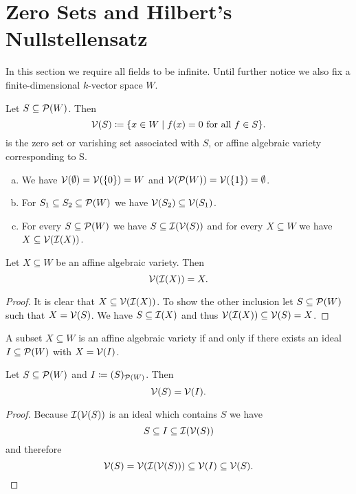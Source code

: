 \section{Zero Sets and Hilbert’s Nullstellensatz}
In this section we require all fields to be infinite. Until further notice we also fix a finite-dimensional $k$-vector space $W$.


\begin{defi}
 Let $S \subseteq \mathcal{P}(W)$. Then
 \[
  \mathcal{V}(S) \coloneqq \{x \in W \mid f(x) = 0 \text{ for all } f \in S\}.
 \]
 is the zero set or varishing set associated with $S$, or affine algebraic variety corresponding to S.
\end{defi}


\begin{expls}
 \begin{enumerate}[a)]
  \item
  We have $\mathcal{V}(\emptyset) = \mathcal{V}(\{0\}) = W$ and $\mathcal{V}(\mathcal{P}(W)) = \mathcal{V}(\{1\}) = \emptyset$.
  \item
  For $S_1 \subseteq S_2 \subseteq \mathcal{P}(W)$ we have $\mathcal{V}(S_2) \subseteq \mathcal{V}(S_1)$.
  \item
  For every $S \subseteq \mathcal{P}(W)$ we have $S \subseteq \mathcal{I}(\mathcal{V}(S))$ and for every $X \subseteq W$ we have $X \subseteq \mathcal{V}(\mathcal{I}(X))$.
 \end{enumerate}
\end{expls}


\begin{lem}
 Let $X \subseteq W$ be an affine algebraic variety. Then
 \[
  \mathcal{V}(\mathcal{I}(X)) = X.
 \]
\end{lem}
\begin{proof}
 It is clear that $X \subseteq \mathcal{V}(\mathcal{I}(X))$. To show the other inclusion let $S \subseteq \mathcal{P}(W)$ such that $X = \mathcal{V}(S)$. We have $S \subseteq \mathcal{I}(X)$ and thus $\mathcal{V}(\mathcal{I}(X)) \subseteq \mathcal{V}(S) = X$.
\end{proof}


\begin{cor}
 A subset $X \subseteq W$ is an affine algebraic variety if and only if there exists an ideal $I \subseteq \mathcal{P}(W)$ with $X = \mathcal{V}(I)$.
\end{cor}



\begin{cor}
 Let $S \subseteq \mathcal{P}(W)$ and $I \coloneqq (S)_{\mathcal{P}(W)}$. Then
 \[
  \mathcal{V}(S) = \mathcal{V}(I).
 \]
\end{cor}
\begin{proof}
 Because $\mathcal{I}(\mathcal{V}(S))$ is an ideal which contains $S$ we have
 \[
  S \subseteq I \subseteq \mathcal{I}(\mathcal{V}(S))
 \]
 and therefore
 \[
  \mathcal{V}(S) = \mathcal{V}(\mathcal{I}(\mathcal{V}(S))) \subseteq \mathcal{V}(I) \subseteq \mathcal{V}(S).
 \]
\end{proof}


